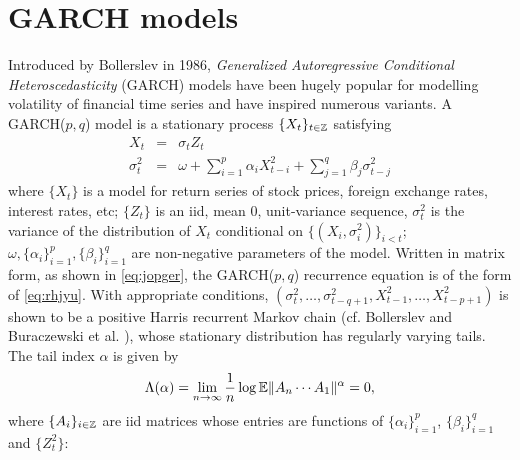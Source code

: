 
\section{GARCH models}
\label{sec:garch:intro}
Introduced by Bollerslev \cite{bollerslev:1986} in 1986,
{\em Generalized Autoregressive Conditional Heteroscedasticity}
(GARCH) models have been hugely popular for modelling volatility of
financial time series and have inspired numerous variants.
A GARCH($p, q$) model is a stationary process
$\{X_t\}_{t \in \mathbb Z}$ satisfying
\begin{eqnarray}
  \label{eq:garch:intro}
  X_t &=& \sigma_t Z_t \\
  \sigma_t^2 &=& \omega + \sum_{i=1}^p \alpha_i X_{t-i}^2 +
  \sum_{j=1}^q \beta_j \sigma_{t-j}^2
\end{eqnarray}
where $\{X_t\}$ is a model for return series of stock prices,
foreign exchange rates, interest rates, etc; $\{Z_t\}$ is an iid,
mean 0, unit-variance sequence, $\sigma_t^2$ is the variance of the
distribution of $X_t$ conditional on
$\{(X_i, \sigma_i^2)\}_{i < t}$; $\omega, \{\alpha_i\}_{i=1}^p,
\{\beta_i\}_{i=1}^q$ are non-negative parameters of the model.
Written in matrix form, as shown in \eqref{eq:jopger}, the
GARCH($p,q$) recurrence  equation is of the form of
\eqref{eq:rhjyu}. With appropriate conditions,
$(\sigma_t^2, \dots, \sigma_{t-q+1}^2, X_{t-1}^2, \dots, X_{t - p +1}^2)$
is shown to be a positive Harris recurrent Markov chain
(cf. Bollerslev \cite{bollerslev:1986} and Buraczewski et al.
\cite{buraczewski:damek:mikosch:2016}), whose stationary distribution
has regularly varying tails. The tail index $\alpha$ is given by
\begin{equation}
  \label{eq:grgbg}
  \Lambda(\alpha) = \lim_{n \to \infty} {1 \over n}\log\mathbb{E}\|A_n \cdots A_1\|^\alpha = 0,
\end{equation}
where $\{A_i\}_{i \in \mathbb Z}$ are iid matrices whose entries are
functions of $\{\alpha_i\}_{i=1}^p$, $\{\beta_i\}_{i=1}^q$ and
$\{Z_t^2\}$:
